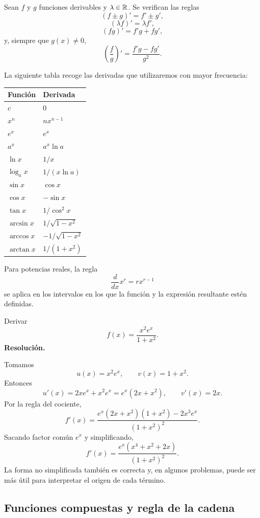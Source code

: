 Sean $f$ y $g$ funciones derivables y $\lambda\in\mathbb{R}$. Se verifican las reglas
\[
(f\pm g)'=f'\pm g',
\]
\[
(\lambda f)'=\lambda f',
\]
\[
(fg)'=f'g+fg',
\]
y, siempre que $g(x)\neq0$,
\[
\left(\frac{f}{g}\right)'
=
\frac{f'g-fg'}{g^2}.
\]

La siguiente tabla recoge las derivadas que utilizaremos con mayor frecuencia:

\begin{center}
\renewcommand{\arraystretch}{1.5}
\begin{tabular}{@{}ll@{}}
\toprule
Función & Derivada \\
\midrule
$c$ & $0$ \\
$x^n$ & $nx^{n-1}$ \\
$e^x$ & $e^x$ \\
$a^x$ & $a^x\ln a$ \\
$\ln x$ & $1/x$ \\
$\log_a x$ & $1/(x\ln a)$ \\
$\sin x$ & $\cos x$ \\
$\cos x$ & $-\sin x$ \\
$\tan x$ & $1/\cos^2x$ \\
$\arcsin x$ & $1/\sqrt{1-x^2}$ \\
$\arccos x$ & $-1/\sqrt{1-x^2}$ \\
$\arctan x$ & $1/(1+x^2)$ \\
\bottomrule
\end{tabular}
\end{center}

Para potencias reales, la regla
\[
\frac{d}{dx}x^r=rx^{r-1}
\]
se aplica en los intervalos en los que la función y la expresión resultante estén definidas.

\begin{solvedexercise}
Derivar
\[
f(x)=\frac{x^2e^x}{1+x^2}.
\]
\tcblower
\textbf{Resolución.}\par\smallskip
Tomamos
\[
u(x)=x^2e^x,
\qquad
v(x)=1+x^2.
\]
Entonces
\[
u'(x)=2xe^x+x^2e^x=e^x(2x+x^2),
\qquad
v'(x)=2x.
\]
Por la regla del cociente,
\[
f'(x)=
\frac{e^x(2x+x^2)(1+x^2)-2x^3e^x}{(1+x^2)^2}.
\]
Sacando factor común $e^x$ y simplificando,
\[
\boxed{
f'(x)=\frac{e^x(x^4+x^2+2x)}{(1+x^2)^2}
}.
\]
La forma no simplificada también es correcta y, en algunos problemas, puede ser más útil para interpretar el origen de cada término.
\end{solvedexercise}

\subsection{Funciones compuestas y regla de la cadena}

